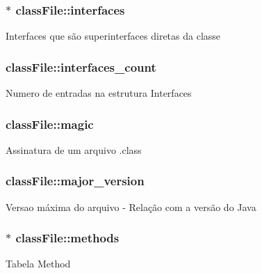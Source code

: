 \subsubsection[{\texorpdfstring{interfaces}{interfaces}}]{$\ast$ class\+File\+::interfaces}\hypertarget{structclassFile_a4b17bc5bb5475d1f7db40302ba9e1df1}{}\label{structclassFile_a4b17bc5bb5475d1f7db40302ba9e1df1}
Interfaces que são superinterfaces diretas da classe 
\subsubsection[{\texorpdfstring{interfaces\+\_\+count}{interfaces_count}}]{ class\+File\+::interfaces\+\_\+count}\hypertarget{structclassFile_ab1ef5a76288d97e248fd48a46e93a185}{}\label{structclassFile_ab1ef5a76288d97e248fd48a46e93a185}
Numero de entradas na estrutura Interfaces 
\subsubsection[{\texorpdfstring{magic}{magic}}]{ class\+File\+::magic}\hypertarget{structclassFile_a3fec808625410854af3cb80b7faeca10}{}\label{structclassFile_a3fec808625410854af3cb80b7faeca10}
Assinatura de um arquivo .class 
\subsubsection[{\texorpdfstring{major\+\_\+version}{major_version}}]{ class\+File\+::major\+\_\+version}\hypertarget{structclassFile_a3765d2f6ef5f54e8e2c554afadb795f6}{}\label{structclassFile_a3765d2f6ef5f54e8e2c554afadb795f6}
Versao máxima do arquivo -\/ Relação com a versão do Java 
\subsubsection[{\texorpdfstring{methods}{methods}}]{$\ast$ class\+File\+::methods}\hypertarget{structclassFile_a5417beaa23b6e9d5329dbee87a1f5238}{}\label{structclassFile_a5417beaa23b6e9d5329dbee87a1f5238}
Tabela Method 
